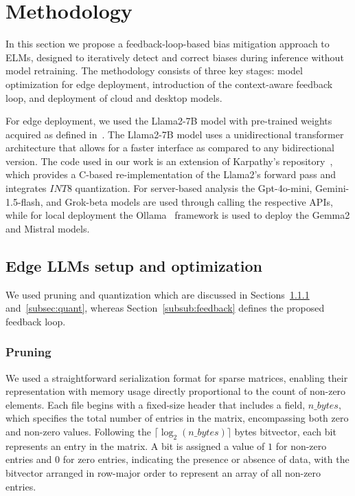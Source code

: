 
\section{Methodology}
\label{sec:method} 

In this section we propose a feedback-loop-based bias mitigation approach to ELMs, designed to iteratively detect and correct biases during inference without model retraining. 
The methodology consists of three key stages: model optimization for edge deployment, introduction of the context-aware feedback loop, and deployment of cloud and desktop models.

For edge deployment, we used the Llama2-7B model with pre-trained weights acquired as defined in~\cite{touvron2023llama}. 
The Llama2-7B model uses a unidirectional transformer architecture that allows for a faster interface as compared to any bidirectional version. 
The code used in our work is an extension of Karpathy’s repository~\cite{githubGitHubKarpathyllama2c}, which provides a C-based re-implementation of the Llama2's forward pass and integrates $INT8$ quantization. 
For server-based analysis the Gpt-4o-mini, Gemini-1.5-flash, and Grok-beta models are used through calling the respective APIs, while for local deployment the Ollama~\cite{13} framework is used to deploy the Gemma2 and Mistral models.



\subsection{Edge LLMs setup and optimization}
\label{subsec:model-optimization} 

We used pruning and quantization which are discussed in Sections~\ref{subsec:pruning} and~\ref{subsec:quant}, whereas Section~\ref{subsub:feedback} defines the proposed feedback loop. 


\subsubsection{Pruning}
\label{subsec:pruning} 

We used a straightforward serialization format for sparse matrices, enabling their representation with memory usage directly proportional to the count of non-zero elements. 
Each file begins with a fixed-size header that includes a field, $n\_bytes$, which specifies the total number of entries in the matrix, encompassing both zero and non-zero values. 
Following the $\lceil \log_2(n\_bytes) \rceil$ bytes bitvector, each bit represents an entry in the matrix. A bit is assigned a value of $1$ for non-zero entries and $0$ for zero entries, indicating the presence or absence of data, with the bitvector arranged in row-major order to represent an array of all non-zero entries.

